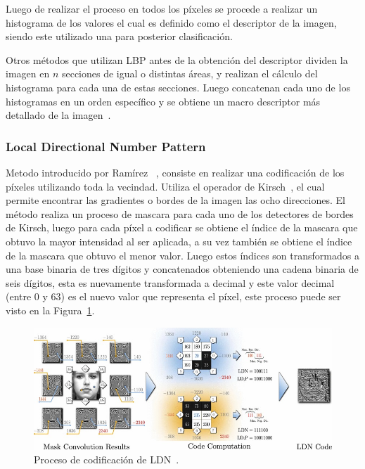 Luego de realizar el proceso en todos los píxeles se procede a realizar un histograma de los valores el cual es definido como el descriptor de la imagen, siendo este utilizado una para posterior clasificación.

Otros métodos que utilizan LBP antes de la obtención del descriptor dividen la imagen en $n$ secciones de igual o distintas áreas, y realizan el cálculo del histograma para cada una de estas secciones. Luego concatenan cada uno de los histogramas en un orden específico y se obtiene un macro descriptor más detallado de la imagen~\cite{Ahonen2006}.

		\subsubsection{Local Directional Number Pattern}
		\label{sec:lnd}
		Metodo introducido por Ramírez \etal~\cite{RamirezRivera2013}, consiste en realizar una codificación de los píxeles utilizando toda la vecindad. Utiliza el operador de Kirsch~\cite{Kirsch1971}, el cual permite encontrar las gradientes o bordes de la imagen las ocho direcciones. El método realiza un proceso de mascara para cada uno de los detectores de bordes de Kirsch, luego para cada píxel a codificar se obtiene el índice de la mascara que obtuvo la mayor intensidad al ser aplicada, a su vez también se obtiene el índice de la mascara que obtuvo el menor valor. Luego estos índices son transformados a una base binaria de tres dígitos y concatenados obteniendo una cadena binaria de seis dígitos, esta es nuevamente transformada a decimal y este valor decimal (entre 0 y 63) es el nuevo valor que representa el píxel, este proceso puede ser visto en la Figura~\ref{art:fig:ldn}.
		
\begin{figure}[tb]
  \centering
   \includegraphics[width=1\textwidth]{Figuras/ldn.jpg}
  \caption{Proceso de codificación de LDN~\cite{RamirezRivera2013}.}
  \label{art:fig:ldn}
\end{figure}

